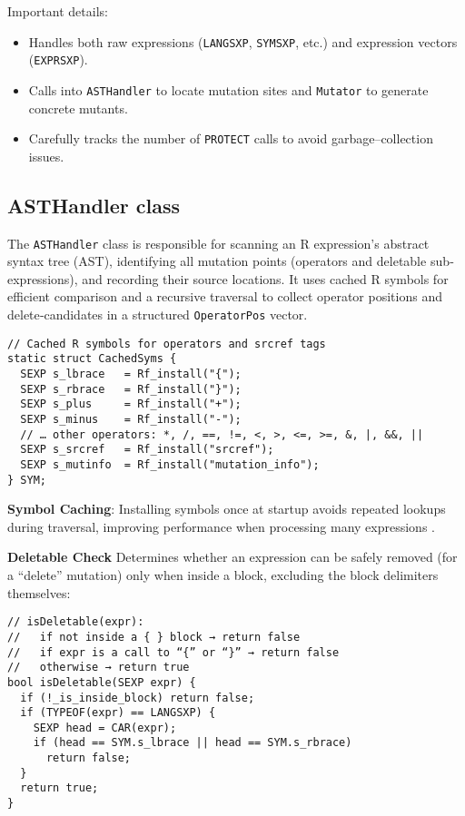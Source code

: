 Important details:
\begin{itemize}
  \item Handles both raw expressions (\texttt{LANGSXP}, \texttt{SYMSXP}, etc.) and expression vectors (\texttt{EXPRSXP}).
  \item Calls into \texttt{ASTHandler} to locate mutation sites and \texttt{Mutator} to generate concrete mutants.
  \item Carefully tracks the number of \texttt{PROTECT} calls to avoid garbage–collection issues.
\end{itemize}


\subsection{ASTHandler class}

The \texttt{ASTHandler} class is responsible for scanning an R expression’s abstract syntax tree (AST), identifying all mutation points (operators and deletable sub‐expressions), and recording their source locations.  It uses cached R symbols for efficient comparison and a recursive traversal to collect operator positions and delete‐candidates in a structured \texttt{OperatorPos} vector.

\begin{verbatim}
// Cached R symbols for operators and srcref tags
static struct CachedSyms {
  SEXP s_lbrace   = Rf_install("{");
  SEXP s_rbrace   = Rf_install("}");
  SEXP s_plus     = Rf_install("+");
  SEXP s_minus    = Rf_install("-");
  // … other operators: *, /, ==, !=, <, >, <=, >=, &, |, &&, ||
  SEXP s_srcref   = Rf_install("srcref");
  SEXP s_mutinfo  = Rf_install("mutation_info");
} SYM;
\end{verbatim}

\noindent\textbf{Symbol Caching}: Installing symbols once at startup avoids repeated lookups during traversal, improving performance when processing many expressions \cite{rcore2024}.

\medskip
\noindent\textbf{Deletable Check}  
Determines whether an expression can be safely removed (for a “delete” mutation) only when inside a block, excluding the block delimiters themselves:

\begin{verbatim}
// isDeletable(expr):
//   if not inside a { } block → return false
//   if expr is a call to “{” or “}” → return false
//   otherwise → return true
bool isDeletable(SEXP expr) {
  if (!_is_inside_block) return false;
  if (TYPEOF(expr) == LANGSXP) {
    SEXP head = CAR(expr);
    if (head == SYM.s_lbrace || head == SYM.s_rbrace)
      return false;
  }
  return true;
}
\end{verbatim}


